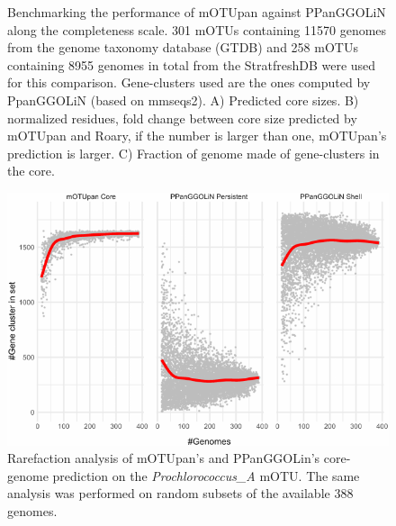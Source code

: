 \documentclass{article}
\begin{document}
\begin{figure}
	\caption[mOTUpan vs. PPanGGOLiN]
	{Benchmarking the performance of mOTUpan against PPanGGOLiN along the completeness scale. 301 mOTUs containing 11570 genomes from the genome taxonomy database (GTDB) and 258 mOTUs containing 8955 genomes in total from the StratfreshDB were used for this comparison. Gene-clusters used are the ones computed by PpanGGOLiN (based on mmseqs2). A) Predicted core sizes. B) normalized residues, fold change between core size predicted by mOTUpan and Roary, if the number is larger than one, mOTUpan’s prediction is larger. C) Fraction of genome made of gene-clusters in the core.}
	\label{fig:ppanggolin}
\end{figure}

\begin{figure}
	\centering
	\includegraphics{figs/Fig_3_flat}
	\caption[Prochlorococcus_A rarefaction]
	{Rarefaction analysis of mOTUpan’s and PPanGGOLin’s core-genome prediction on the \textit{Prochlorococcus\_A} mOTU. The same analysis was performed on random subsets of the available 388 genomes.}
	\label{fig:rarefy}
\end{figure}
\end{document}

